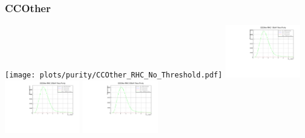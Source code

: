 \subsubsection{CCOther}

\begin{center}

\texttt{[image: plots/purity/CCOther\_RHC\_No\_Threshold.pdf]}
\includegraphics[width=0.245\textwidth]{plots/purity/CCOther_RHC_10MeV.pdf} 
\includegraphics[width=0.245\textwidth]{plots/purity/CCOther_RHC_20MeV.pdf}
\includegraphics[width=0.245\textwidth]{plots/purity/CCOther_RHC_50MeV.pdf}

\end{center}
